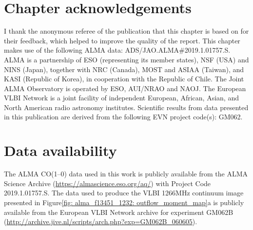 \vspace*{\fill}

\section*{Chapter acknowledgements}

I thank the anonymous referee of the publication that this chapter is based on for their feedback, which helped to improve the quality of the report. This chapter makes use of the following ALMA data: ADS/JAO.ALMA\#2019.1.01757.S. ALMA is a partnership of ESO (representing its member states), NSF (USA) and NINS (Japan), together with NRC (Canada), MOST and ASIAA (Taiwan), and KASI (Republic of Korea), in cooperation with the Republic of Chile. The Joint ALMA Observatory is operated by ESO, AUI/NRAO and NAOJ. The European VLBI Network is a joint facility of independent European, African, Asian, and North American radio astronomy institutes. Scientific results from data presented in this publication are derived from the following EVN project code(s): GM062.

\section*{Data availability}

The ALMA CO(1--0) data used in this work is publicly available from the ALMA Science Archive (\url{https://almascience.eso.org/aq/}) with Project Code 2019.1.01757.S. The data used to produce the VLBI 1266\;MHz continuum image presented in Figure\;\ref{fig: alma_f13451_1232: outflow_moment_map}a is publicly available from the European VLBI Network archive for experiment GM062B (\url{http://archive.jive.nl/scripts/arch.php?exp=GM062B_060605}).